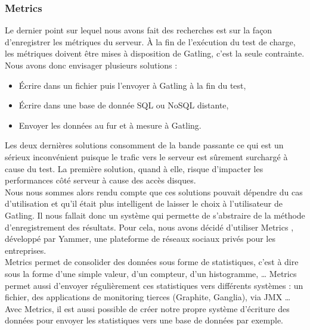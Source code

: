\subsubsection{Metrics}

Le dernier point sur lequel nous avons fait des recherches est sur la façon d'enregistrer les métriques du serveur. À la fin de l'exécution du test de charge, les métriques doivent être mises à disposition de Gatling, c'est la seule contrainte.\\

Nous avons donc envisager plusieurs solutions :

\begin{itemize}
 \item Écrire dans un fichier puis l'envoyer à Gatling à la fin du test,
 \item Écrire dans une base de donnée SQL ou NoSQL distante,
 \item Envoyer les données au fur et à mesure à Gatling.\\
\end{itemize}

Les deux dernières solutions consomment de la bande passante ce qui est un sérieux inconvénient puisque le trafic vers le serveur est sûrement surchargé à cause du test. La première solution, quand à elle, risque d'impacter les performances côté serveur à cause des accès disques.\\

Nous nous sommes alors rendu compte que ces solutions pouvait dépendre du cas d'utilisation et qu'il était plus intelligent de laisser le choix à l'utilisateur de Gatling. Il nous fallait donc un système qui permette de s'abstraire de la méthode d'enregistrement des résultats. Pour cela, nous avons décidé d'utiliser Metrics \cite{metrics}, développé par Yammer, une plateforme de réseaux sociaux privés pour les entreprises.\\

Metrics permet de consolider des données sous forme de statistiques, c'est à dire sous la forme d'une simple valeur, d'un compteur, d'un histogramme, \dots{} Metrics permet aussi d'envoyer régulièrement ces statistiques vers différents systèmes : un fichier, des applications de monitoring tierces (Graphite, Ganglia), via JMX \dots{}\\

Avec Metrics, il est aussi possible de créer notre propre système d'écriture des données pour envoyer les statistiques vers une base de données par exemple.

